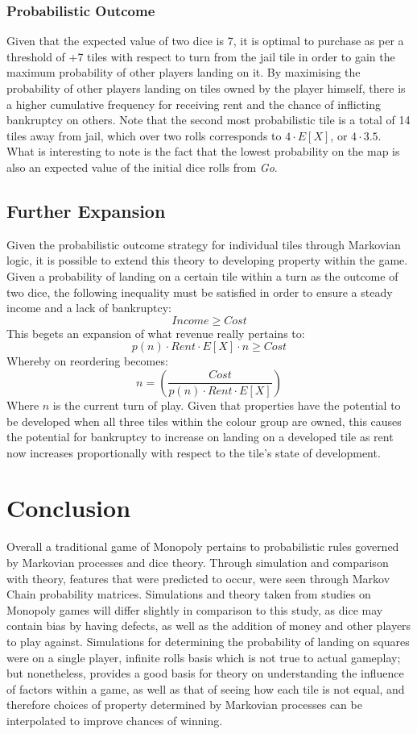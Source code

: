 \documentclass[12pt]{article}
\begin{document}
\subsubsection{Probabilistic Outcome}
Given that the expected value of two dice is 7, it is optimal to purchase as per a threshold of +7 tiles with respect to turn from the jail tile in order to gain the maximum probability of other players landing on it. By maximising the probability of other players landing on tiles owned by the player himself, there is a higher cumulative frequency for receiving rent and the chance of inflicting bankruptcy on others. Note that the second most probabilistic tile is a total of 14 tiles away from jail, which over two rolls corresponds to $4 \cdot E[X]$, or $4\cdot 3.5$. What is interesting to note is the fact that the lowest probability on the map is also an expected value of the initial dice rolls from \emph{Go}.

\subsection{Further Expansion}
Given the probabilistic outcome strategy for individual tiles through Markovian logic, it is possible to extend this theory to developing property within the game. Given a probability of landing on a certain tile within a turn as the outcome of two dice, the following inequality must be satisfied in order to ensure a steady income and a lack of bankruptcy:
$$Income \geq Cost$$
This begets an expansion of what revenue really pertains to:
$$p(n)\cdot Rent\cdot E[X] \cdot n \geq Cost$$
Whereby on reordering becomes:
$$n = \left(\frac{Cost}{p(n)\cdot Rent\cdot E[X]}\right)$$
Where $n$ is the current turn of play. Given that properties have the potential to be developed when all three tiles within the colour group are owned, this causes the potential for bankruptcy to increase on landing on a developed tile as rent now increases proportionally with respect to the tile's state of development.
\section{Conclusion}
Overall a traditional game of Monopoly pertains to probabilistic rules governed by Markovian processes and dice theory. Through simulation and comparison with theory, features that were predicted to occur, were seen through Markov Chain probability matrices. Simulations and theory taken from studies on Monopoly games will differ slightly in comparison to this study, as dice may contain bias by having defects, as well as the addition of money and other players to play against. Simulations for determining the probability of landing on squares were on a single player, infinite rolls basis which is not true to actual gameplay; but nonetheless, provides a good basis for theory on understanding the influence of factors within a game, as well as that of seeing how each tile is not equal, and therefore choices of property determined by Markovian processes can be interpolated to improve chances of winning.
\end{document}

